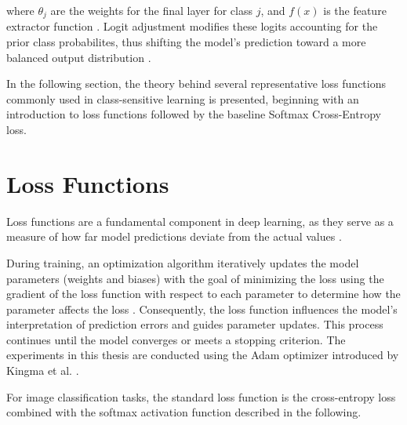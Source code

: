 \noindent where $\theta_j$ are the weights for the final layer for class $j$, and $f(x)$ is the feature extractor function \cite{ren2020balancedmetasoftmaxlongtailedvisual}. Logit adjustment modifies these logits accounting for the prior class probabilites, thus shifting the model's prediction toward a more balanced output distribution \cite{ren2020balancedmetasoftmaxlongtailedvisual}.
\vspace{1em}

\noindent In the following section, the theory behind several representative loss functions commonly used in class-sensitive learning is presented, beginning with an introduction to loss functions followed by the baseline Softmax Cross-Entropy loss. 

\section{Loss Functions}
\label{sec:intro_losses}
Loss functions are a fundamental component in deep learning, as they serve as a measure of how far model predictions deviate from the actual values \cite{zhang2023dive,Goodfellow-et-al-2016}.

During training, an optimization algorithm iteratively updates the model parameters (weights and biases) with the goal of minimizing the loss using the gradient of the loss function with respect to each parameter to determine how the parameter affects the loss \cite{Goodfellow-et-al-2016}. Consequently, the loss function influences the model's interpretation of prediction errors and guides parameter updates. This process continues until the model converges or meets a stopping criterion. The experiments in this thesis are conducted using the Adam optimizer introduced by Kingma et al. \cite{kingma2017adammethodstochasticoptimization}.

For image classification tasks, the standard loss function is the cross-entropy loss combined with the softmax activation function \cite{zhang2023dive} described in the following.


